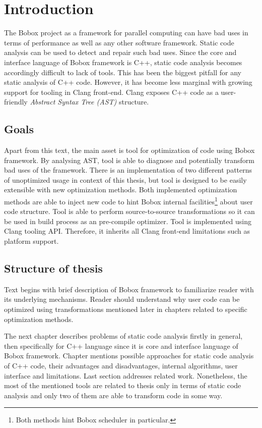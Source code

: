 \chapter{Introduction}
The Bobox project as a framework for parallel computing can have bad uses in terms of performance as well as any other software framework. Static code analysis can be used to detect and repair such bad uses. Since the core and interface language of Bobox framework is C++, static code analysis becomes accordingly difficult to lack of tools. This has been the biggest pitfall for any static analysis of C++ code. However, it has become less marginal with growing support for tooling in Clang front-end. Clang exposes C++ code as a user-friendly \emph{Abstract Syntax Tree (AST)} structure.

\section{Goals}
Apart from this text, the main asset is tool for optimization of code using Bobox framework. By analysing AST, tool is able to diagnose and potentially transform bad uses of the framework. There is an implementation of two different patterns of unoptimized usage in context of this thesis, but tool is designed to be easily extensible with new optimization methods. Both implemented optimization methods are able to inject new code to hint Bobox internal facilities\footnote{Both methods hint Bobox scheduler in particular.} about user code structure. Tool is able to perform source-to-source transformations so it can be used in build process as an pre-compile optimizer. Tool is implemented using Clang tooling API. Therefore, it inherits all Clang front-end limitations such as platform support.

\section{Structure of thesis}
Text begins with brief description of Bobox framework to familiarize reader with its underlying mechanisms. Reader should understand why user code can be optimized using transformations mentioned later in chapters related to specific optimization methods.

The next chapter describes problems of static code analysis firstly in general, then specifically for C++ language since it is core and interface language of Bobox framework. Chapter mentions possible approaches for static code analysis of C++ code, their advantages and disadvantages, internal algorithms, user interface and limitations. Last section addresses related work. Nonetheless, the most of the mentioned tools are related to thesis only in terms of static code analysis and only two of them are able to transform code in some way.

